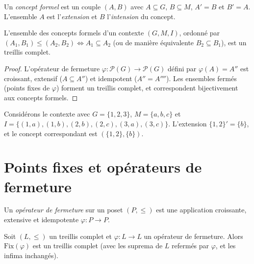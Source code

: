 \begin{definition}
Un \emph{concept formel} est un couple $(A, B)$ avec $A \subseteq G$, $B \subseteq M$,
$A' = B$ et $B' = A$. L'ensemble $A$ est l'\emph{extension} et $B$ l'\emph{intension}
du concept.
\end{definition}

\begin{theoreme}
\label{thm:treillis-concepts}
L'ensemble des concepts formels d'un contexte $(G, M, I)$, ordonn\'e par
$(A_1, B_1) \leq (A_2, B_2) \Leftrightarrow A_1 \subseteq A_2$ (ou de mani\`ere
\'equivalente $B_2 \subseteq B_1$), est un treillis complet.
\end{theoreme}

\begin{proof}
L'op\'erateur de fermeture $\varphi\colon \mathcal{P}(G) \to \mathcal{P}(G)$ d\'efini par
$\varphi(A) = A''$ est croissant, extensif ($A \subseteq A''$) et idempotent
($A'' = A''''$). Les ensembles ferm\'es (points fixes de $\varphi$) forment un treillis
complet, et correspondent bijectivement aux concepts formels.
\end{proof}

\begin{exemple}
Consid\'erons le contexte avec $G = \{1, 2, 3\}$, $M = \{a, b, c\}$ et
$I = \{(1,a), (1,b), (2,b), (2,c), (3,a), (3,c)\}$. L'extension $\{1,2\}' = \{b\}$,
et le concept correspondant est $(\{1,2\}, \{b\})$.
\end{exemple}

\section{Points fixes et op\'erateurs de fermeture}

\begin{definition}
Un \emph{op\'erateur de fermeture} sur un poset $(P, \leq)$ est une application croissante,
extensive et idempotente $\varphi\colon P \to P$.
\end{definition}

\begin{theoreme}
Soit $(L, \leq)$ un treillis complet et $\varphi\colon L \to L$ un op\'erateur de fermeture.
Alors $\mathrm{Fix}(\varphi)$ est un treillis complet (avec les suprema de $L$ referm\'es
par $\varphi$, et les infima inchang\'es).
\end{theoreme}

